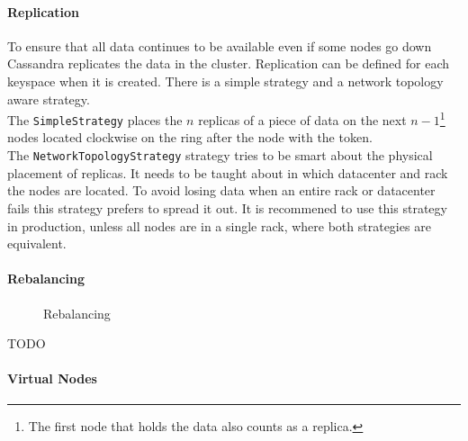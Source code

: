 \paragraph{Replication} To ensure that all data continues to be available even if some nodes go down Cassandra replicates the data in the cluster. Replication can be defined for each keyspace when it is created. There is a simple strategy and a network topology aware strategy. \\
The \texttt{SimpleStrategy} places the $n$ replicas of a piece of data on the next $n-1$\footnote{The first node that holds the data also counts as a replica.} nodes located clockwise on the ring after the node with the token. \\
The \texttt{NetworkTopologyStrategy} strategy tries to be smart about the physical placement of replicas. It needs to be taught about in which datacenter and rack the nodes are located. To avoid losing data when an entire rack or datacenter fails this strategy prefers to spread it out.
It is recommened to use this strategy in production, unless all nodes are in a single rack, where both strategies are equivalent.  %

\paragraph{Rebalancing}

\begin{figure}[ht]
  \caption{Rebalancing}
  \label{fig:cassandra:rebalancing}
\end{figure}

TODO

\paragraph{Virtual Nodes}

